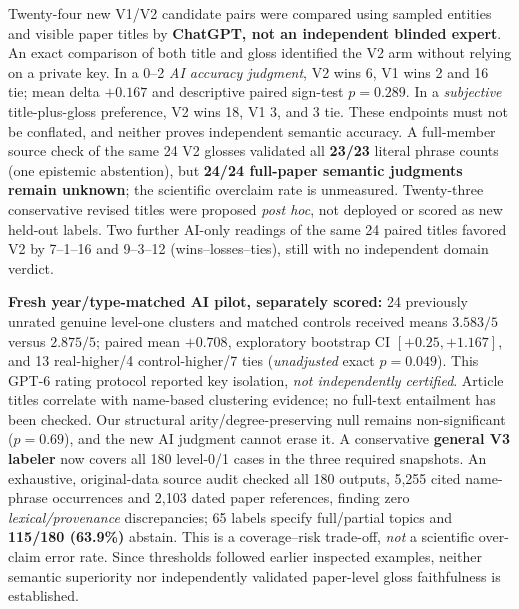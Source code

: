 \documentclass[10pt,twocolumn]{article}
\begin{document}
Twenty-four new V1/V2 candidate pairs were compared using sampled entities and visible paper titles by \textbf{ChatGPT, not an independent blinded expert}. An exact comparison of both title and gloss identified the V2 arm without relying on a private key. In a 0--2 \emph{AI accuracy judgment}, V2 wins 6, V1 wins 2 and 16 tie; mean delta \(+0.167\) and descriptive paired sign-test \(p=0.289\). In a \emph{subjective} title-plus-gloss preference, V2 wins 18, V1 3, and 3 tie. These endpoints must not be conflated, and neither proves independent semantic accuracy. A full-member source check of the same 24 V2 glosses validated all \textbf{23/23} literal phrase counts (one epistemic abstention), but \textbf{24/24 full-paper semantic judgments remain unknown}; the scientific overclaim rate is unmeasured. Twenty-three conservative revised titles were proposed \emph{post hoc}, not deployed or scored as new held-out labels. Two further AI-only readings of the same 24 paired titles favored V2 by 7--1--16 and 9--3--12 (wins--losses--ties), still with no independent domain verdict.\par
\textbf{Fresh year/type-matched AI pilot, separately scored:} 24 previously unrated genuine level-one clusters and matched controls received means \(3.583/5\) versus \(2.875/5\); paired mean \(+0.708\), exploratory bootstrap CI \([+0.25,+1.167]\), and 13 real-higher/4 control-higher/7 ties (\emph{unadjusted} exact \(p=0.049\)). This GPT-6 rating protocol reported key isolation, \emph{not independently certified}. Article titles correlate with name-based clustering evidence; no full-text entailment has been checked. Our structural arity/degree-preserving null remains non-significant (\(p=0.69\)), and the new AI judgment cannot erase it. A conservative \textbf{general V3 labeler} now covers all 180 level-0/1 cases in the three required snapshots. An exhaustive, original-data source audit checked all 180 outputs, 5,255 cited name-phrase occurrences and 2,103 dated paper references, finding zero \emph{lexical/provenance} discrepancies; 65 labels specify full/partial topics and \textbf{115/180 (63.9\%)} abstain. This is a coverage--risk trade-off, \emph{not} a scientific over-claim error rate. Since thresholds followed earlier inspected examples, neither semantic superiority nor independently validated paper-level gloss faithfulness is established. \par
\end{document}
